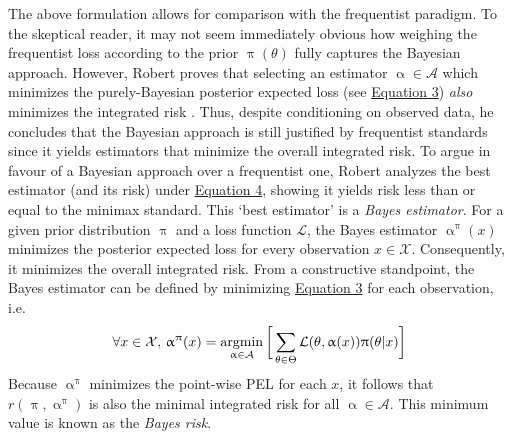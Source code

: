 \documentclass[letterpaper,12pt]{article}
\newcommand{\given}{|}
\begin{document}
The above formulation allows for comparison with the frequentist paradigm. To the skeptical reader, it may not seem immediately obvious how weighing the frequentist loss according to the prior $\uppi(\theta)$ fully captures the Bayesian approach. However, Robert proves that selecting an estimator $\upalpha \in \mathcal{A}$ which minimizes the purely-Bayesian posterior expected loss (see \hyperref[eq:PEL]{Equation 3}) \textit{also} minimizes the integrated risk \cite{robert2007bayesian}. Thus, despite conditioning on observed data, he concludes that the Bayesian approach is still justified by frequentist standards since it yields estimators that minimize the overall integrated risk. To argue in favour of a Bayesian approach over a frequentist one, Robert analyzes the best estimator (and its risk) under \hyperref[eq:IR]{Equation 4}, showing it yields risk less than or equal to the minimax standard. This `best estimator' is a \textit{Bayes estimator}. For a given prior distribution $\uppi$ and a loss function $\mathcal{L}$, the Bayes estimator $\upalpha^{\uppi}(x)$ minimizes the posterior expected loss for every observation $x \in \mathcal{X}$. Consequently, it minimizes the overall integrated risk. From a constructive standpoint, the Bayes estimator can be defined by minimizing \hyperref[eq:PEL]{Equation 3} for each observation, i.e.\vspace{-0.75cm}$$
\forall x \in \mathcal{X}, \,\upalpha^{\uppi}(x) = \underset{\upalpha \in \mathcal{A}}{\text{argmin}} \, \bigg[\sum_{\theta \in \Theta} \mathcal{L}(\theta, \upalpha(x)) \uppi(\theta \given x)\bigg] \vspace{-0.5cm}
$$Because $\upalpha^{\uppi}$ minimizes the point-wise PEL for each $x$, it follows that $r(\uppi, \upalpha^{\uppi})$ is also the minimal integrated risk for all $\upalpha \in \mathcal{A}$. This minimum value is known as the \textit{Bayes risk}. 
\end{document}
